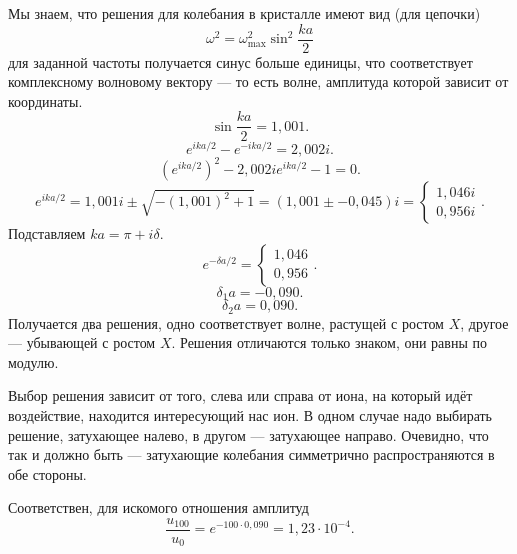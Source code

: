 \documentclass[a4paper]{article}
\begin{document}
\begin{hiProb}[2.72]
\end{hiProb}
\begin{sol}
Мы знаем, что решения для колебания в кристалле
имеют вид (для цепочки)
\[
\omega^2 =\omega^2_{\max} \sin^2 \frac{ka}{2}
\] 
для заданной частоты получается синус больше единицы, что
соответствует комплексному волновому вектору ---
то есть волне, амплитуда которой зависит от координаты.
\[
\sin \frac{ka}{2}= 1,001
.\] 
\[
e^{ika /2}-e^{-ika /2}=2,002 i
.\] 
\[
	\left( e^{ika /2} \right) ^2 -
	2,002 i e^{ika /2}-1=0
.\] 
\[
	e^{ika /2}=1,001 i \pm \sqrt{- (1,001)^2+1} 
	=\left( 1,001 \pm -0,045 \right) i=
	\begin{cases}
		1,046i\\
		0,956i
	\end{cases}
.\] 
Подставляем $ka= \pi +i \delta$.
\[
e^{-\delta a /2}= \begin{cases}
	1,046\\
	0,956
\end{cases}
.\] 
\[
\delta_1 a=-0,090
.\] 
\[
\delta_2 a=0,090
.\] 
Получается два решения, одно соответствует волне,
растущей с ростом $X$, другое --- убывающей с ростом
$X$. Решения отличаются только знаком, они
равны по модулю.

Выбор решения зависит от того, слева или справа от иона,
на который идёт воздействие, находится интересующий
нас ион. В одном случае надо выбирать решение,
затухающее налево, в другом --- затухающее направо.
Очевидно, что так и должно быть --- затухающие
колебания симметрично распространяются в обе стороны.

Соответствен, для искомого отношения амплитуд
\[
\frac{u_{100}}{u_0}= e^{-100 \cdot 0,090}=1,23
\cdot 10^{-4}
.\] 
\end{sol}
\end{document}
